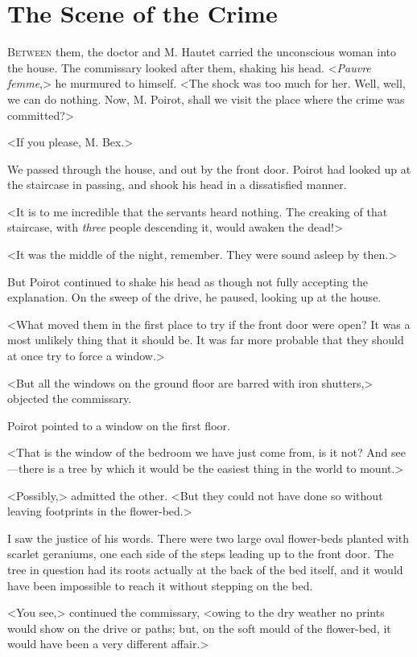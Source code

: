 \chapter{The Scene of the Crime}

\lettrine{B}{etween} them, the doctor and M. Hautet carried the unconscious woman into the house. The commissary looked after them, shaking his head. 
\zz
 <\emph{Pauvre femme},> he murmured to himself. <The shock was too much for her. Well, well, we can do nothing. Now, M. Poirot, shall we visit the place where the crime was committed?> 

 <If you please, M. Bex.> 

 We passed through the house, and out by the front door. Poirot had looked up at the staircase in passing, and shook his head in a dissatisfied manner. 

 <It is to me incredible that the servants heard nothing. The creaking of that staircase, with \emph{three} people descending it, would awaken the dead!> 

 <It was the middle of the night, remember. They were sound asleep by then.> 

 But Poirot continued to shake his head as though not fully accepting the explanation. On the sweep of the drive, he paused, looking up at the house. 

 <What moved them in the first place to try if the front door were open? It was a most unlikely thing that it should be. It was far more probable that they should at once try to force a window.> 

 <But all the windows on the ground floor are barred with iron shutters,> objected the commissary. 

 Poirot pointed to a window on the first floor. 

 <That is the window of the bedroom we have just come from, is it not? And see—there is a tree by which it would be the easiest thing in the world to mount.> 

 <Possibly,> admitted the other. <But they could not have done so without leaving footprints in the flower-bed.> 

 I saw the justice of his words. There were two large oval flower-beds planted with scarlet geraniums, one each side of the steps leading up to the front door. The tree in question had its roots actually at the back of the bed itself, and it would have been impossible to reach it without stepping on the bed. 

 <You see,> continued the commissary, <owing to the dry weather no prints would show on the drive or paths; but, on the soft mould of the flower-bed, it would have been a very different affair.> 

